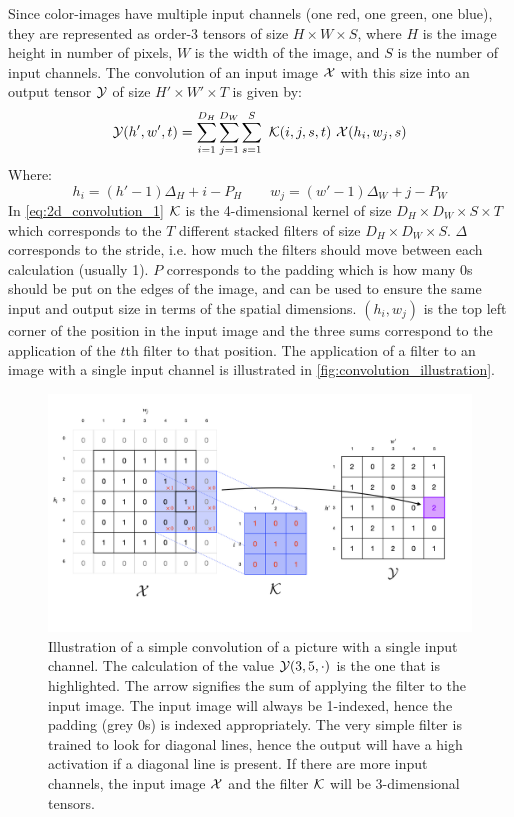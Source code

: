 Since color-images have multiple input channels (one red, one green, one blue), they are represented as order-3 tensors of size $H \times W \times S$, where $H$ is the image height in number of pixels, $W$ is the width of the image, and $S$ is the number of input channels. The convolution of an input image $\mathcal{X}$ with this size into an output tensor $\mathcal{Y}$ of size $H' \times W' \times T$ is given by:
\begin{equation}
    \mathcal{Y}(h', w', t) =\sum_{i=1}^{D_H} \sum_{j=1}^{D_W} \sum_{s=1}^{S} \ \mathcal{K}(i, j, s, t) \ \mathcal{X}(h_i, w_j, s)
    \label{eq:2d_convolution_1}
\end{equation}
Where:
\begin{equation}
    h_i =  \left(h' - 1\right) \Delta_H + i - P_H \qquad w_j =  \left(w' - 1\right) \Delta_W + j - P_W
\end{equation}
In \eqref{eq:2d_convolution_1} $\mathcal{K}$ is the 4-dimensional kernel of size $D_H \times D_W \times S \times T$ which corresponds to the $T$ different stacked filters of size $D_H \times D_W \times S$. $\Delta$ corresponds to the stride, i.e. how much the filters should move between each calculation (usually 1). $P$ corresponds to the padding which is how many 0s should be put on the edges of the image, and can be used to ensure the same input and output size in terms of the spatial dimensions. $(h_i, w_j)$ is the top left corner of the position in the input image and the three sums correspond to the application of the $t$th filter to that position. The application of a filter to an image with a single input channel is illustrated in \autoref{fig:convolution_illustration}.
\begin{figure}
    \centering
    \captionsetup{width=.95\linewidth}
    \includegraphics[width=\linewidth]{Pics/02_Theory/convolution_illustration.png}
    \caption{Illustration of a simple convolution of a picture with a single input channel. The calculation of the value $\mathcal{Y}(3, 5, \cdot)$ is the one that is highlighted. The arrow signifies the sum of applying the filter to the input image. The input image will always be 1-indexed, hence the padding (grey 0s) is indexed appropriately. The very simple filter is trained to look for diagonal lines, hence the output will have a high activation if a diagonal line is present. If there are more input channels, the input image $\mathcal{X}$ and the filter $\mathcal{K}$ will be 3-dimensional tensors.}
    \label{fig:convolution_illustration}
\end{figure}
